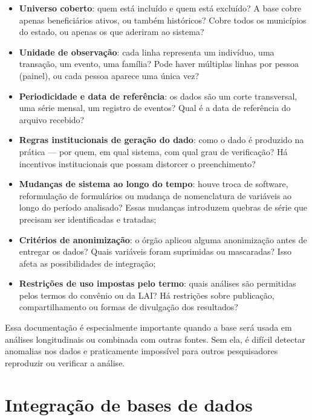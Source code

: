 \begin{itemize}
  \item \textbf{Universo coberto}: quem está incluído e quem está excluído? A base cobre apenas beneficiários ativos, ou também históricos? Cobre todos os municípios do estado, ou apenas os que aderiram ao sistema?

  \item \textbf{Unidade de observação}: cada linha representa um indivíduo, uma transação, um evento, uma família? Pode haver múltiplas linhas por pessoa (painel), ou cada pessoa aparece uma única vez?

  \item \textbf{Periodicidade e data de referência}: os dados são um corte transversal, uma série mensal, um registro de eventos? Qual é a data de referência do arquivo recebido?

  \item \textbf{Regras institucionais de geração do dado}: como o dado é produzido na prática --- por quem, em qual sistema, com qual grau de verificação? Há incentivos institucionais que possam distorcer o preenchimento?

  \item \textbf{Mudanças de sistema ao longo do tempo}: houve troca de software, reformulação de formulários ou mudança de nomenclatura de variáveis ao longo do período analisado? Essas mudanças introduzem quebras de série que precisam ser identificadas e tratadas;

  \item \textbf{Critérios de anonimização}: o órgão aplicou alguma anonimização antes de entregar os dados? Quais variáveis foram suprimidas ou mascaradas? Isso afeta as possibilidades de integração;

  \item \textbf{Restrições de uso impostas pelo termo}: quais análises são permitidas pelos termos do convênio ou da LAI? Há restrições sobre publicação, compartilhamento ou formas de divulgação dos resultados?
\end{itemize}

Essa documentação é especialmente importante quando a base será usada em análises longitudinais ou combinada com outras fontes. Sem ela, é difícil detectar anomalias nos dados e praticamente impossível para outros pesquisadores reproduzir ou verificar a análise.

\section{Integração de bases de dados}

